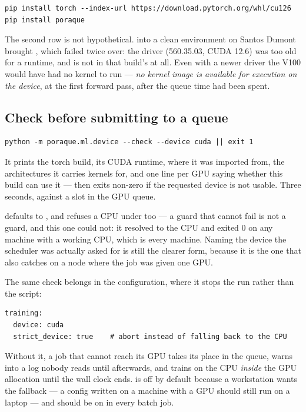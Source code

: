 \begin{lstlisting}
pip install torch --index-url https://download.pytorch.org/whl/cu126
pip install poraque
\end{lstlisting}

The second row is not hypothetical.  into a clean
environment on Santos Dumont brought , which failed
twice over: the driver (560.35.03, CUDA 12.6) was too old for a 
runtime, and  is not in that build's  at all. Even
with a newer driver the V100 would have had no kernel to run --- \emph{no
kernel image is available for execution on the device}, at the first forward
pass, after the queue time had been spent.

\subsection{Check before submitting to a queue}

\begin{lstlisting}
python -m poraque.ml.device --check --device cuda || exit 1
\end{lstlisting}

It prints the torch build, its CUDA runtime, where it was imported from, the
architectures it carries kernels for, and one line per GPU saying whether this
build can use it --- then exits non-zero if the requested device is not usable.
Three seconds, against a slot in the GPU queue.

 defaults to , and  refuses a CPU under
 too --- a guard that cannot fail is not a guard, and this one could
not: it resolved to the CPU and exited 0 on any machine with a working CPU,
which is every machine. Naming the device the scheduler was actually asked for
is still the clearer form, because it is the one that also catches
 on a node where the job was given one GPU.

The same check belongs in the configuration, where it stops the run rather than
the script:

\begin{lstlisting}
training:
  device: cuda
  strict_device: true    # abort instead of falling back to the CPU
\end{lstlisting}

\begin{pnote}
Without it, a job that cannot reach its GPU takes its place in the queue, warns
into a log nobody reads until afterwards, and trains on the CPU \emph{inside}
the GPU allocation until the wall clock ends.  is off by
default because a workstation wants the fallback --- a config written on a
machine with a GPU should still run on a laptop --- and should be on in every
batch job.
\end{pnote}


